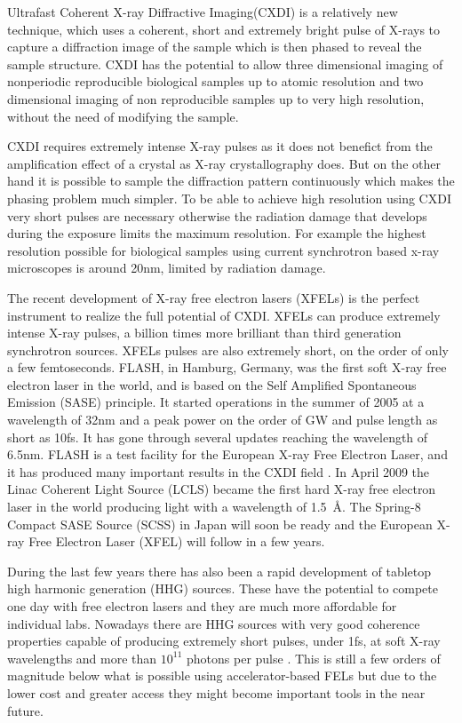 Ultrafast Coherent X-ray Diffractive Imaging(CXDI) is a relatively new
technique, which uses a coherent, short and extremely
bright pulse of X-rays to capture a diffraction image of the sample which is
then phased to reveal the sample structure. CXDI has the potential to allow three
dimensional imaging of nonperiodic reproducible biological samples up to atomic
resolution and two dimensional imaging of non reproducible samples up to
very high resolution, without the need of modifying the sample.

CXDI requires extremely intense X-ray pulses as it does not benefict from the
amplification effect of a crystal as X-ray crystallography does. But on the
other hand it is possible to sample the diffraction pattern continuously which
makes the phasing problem much simpler. To be able to achieve high 
resolution using CXDI very short pulses are necessary otherwise the radiation
damage that develops during the exposure limits the maximum resolution. For
example the highest resolution possible for biological samples using current
synchrotron based x-ray microscopes is around 20nm, limited by radiation
damage. \cite{Howells2009Assessment}

The recent development of X-ray free electron lasers (XFELs) is the perfect
instrument to realize the full potential of CXDI. XFELs can produce extremely
intense X-ray pulses, a billion times more brilliant than third
generation synchrotron sources. XFELs pulses are also extremely short, on the order of
only a few femtoseconds. FLASH, in Hamburg, Germany, was the first soft X-ray
free electron laser in the world, and is based on the Self Amplified Spontaneous
Emission (SASE) principle. It started operations in the summer of 2005 at
a wavelength of 32nm and a peak power on the order of GW and pulse length as
short as 10fs. It has gone through several updates reaching the wavelength of
6.5nm. FLASH is a test facility for the European X-ray Free Electron
Laser, and it has produced many important results in the CXDI field \cite{Chapman2006Femtosecond,Chapman2007Femtosecond}. In April 2009 the Linac Coherent Light Source (LCLS)
became the first hard X-ray free electron laser in the world producing light
with a wavelength of \mbox{1.5 \AA}. The Spring-8 Compact SASE Source (SCSS) in
Japan will soon be ready and the European X-ray Free Electron Laser (XFEL)
will follow in a few years.

During the last few years there has also been a rapid development of tabletop
high harmonic generation (HHG) sources. These have the potential to compete one
day with free electron lasers and they are much more affordable for
individual labs. Nowadays there are HHG sources with very good coherence
properties capable of producing extremely short pulses, under 1fs, at soft X-ray wavelengths and more than $10^{11}$ photons
per pulse \cite{Ravasio2009SingleShot}. This is still a few orders of magnitude below what is
possible using accelerator-based FELs but due to the lower cost and greater access they might
become important tools in the near future.

